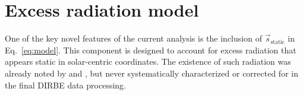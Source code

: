 \documentclass{aa}
\newcommand{\s}[0]{\vec{s}}
\begin{document}
  


  


  


  
  



\section{Excess radiation model}
\label{sec:excess}

One of the key novel features of the current analysis is the inclusion
of $\s_{\mathrm{static}}$ in Eq.~\eqref{eq:model}. This component is
designed to account for excess radiation that appears static in
solar-centric coordinates. The existence of such radiation was already
noted by \citet{reach:1995} and \citet{leinert:1998}, but never
systematically characterized or corrected for in the final DIRBE data
processing.
\end{document}
